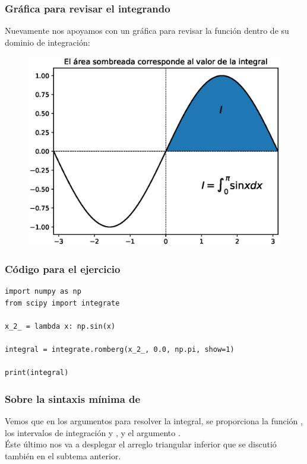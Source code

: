\begin{frame}
\frametitle{Gráfica para revisar el integrando}
Nuevamente nos apoyamos con un gráfica para revisar la función dentro de su dominio de integración:
\begin{figure}[h!]
	\centering
	\includegraphics[scale=0.5]{Imagenes/integracion_modulo_romberg_01.eps}
\end{figure}
\end{frame}
\begin{frame}
\frametitle{Código para el ejercicio}
\begin{lstlisting}[caption=Código para evaluar la integral con \texttt{integrate.quad}, style=FormattedNumber, basicstyle=\linespread{1.1}\ttfamily=\tiny, columns=fullflexible]
import numpy as np
from scipy import integrate

x_2_ = lambda x: np.sin(x)

integral = integrate.romberg(x_2_, 0.0, np.pi, show=1)

print(integral)	
\end{lstlisting}
\end{frame}
\begin{frame}
\frametitle{Sobre la sintaxis mínima de }
Vemos que en los argumentos para resolver la integral, se proporciona la función , los intervalos de integración  y , y el argumento .
\\
\bigskip
\pause
Éste último nos va a desplegar el arreglo triangular inferior que se discutió también en el subtema anterior.
\end{frame}
